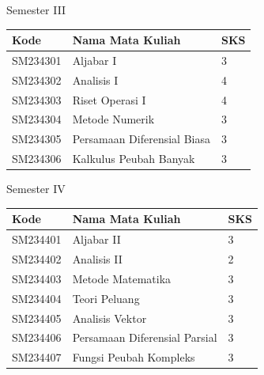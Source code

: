 \documentclass[aspectratio=169]{beamer} %
\begin{document}

\begin{frame}{Semester III}

\begin{table}
	\renewcommand{\arraystretch}{1.3}
	\setlength{\tabcolsep}{10pt}
	\begin{tabular}{l l l}
		\toprule
		\textbf{Kode} & \textbf{Nama Mata Kuliah} & \textbf{SKS} \\
		\midrule
		SM234301 & Aljabar I & 3 \\
		SM234302 & Analisis I & 4 \\
		SM234303 & Riset Operasi I & 4 \\
		SM234304 & Metode Numerik & 3 \\
		SM234305 & Persamaan Diferensial Biasa & 3 \\
		SM234306 & Kalkulus Peubah Banyak & 3 \\
		\bottomrule
	\end{tabular}
\end{table}

\end{frame}


\begin{frame}{Semester IV}

\begin{table}
	\renewcommand{\arraystretch}{1.3}
	\setlength{\tabcolsep}{10pt}
	\begin{tabular}{l l l}
		\toprule
		\textbf{Kode} & \textbf{Nama Mata Kuliah} & \textbf{SKS} \\
		\midrule
		SM234401 & Aljabar II & 3 \\	
		SM234402 & Analisis II & 2 \\	
		SM234403 & Metode Matematika & 3 \\
		SM234404 & Teori Peluang & 3 \\
		SM234405 & Analisis Vektor & 3 \\
		SM234406 & Persamaan Diferensial Parsial & 3 \\
		SM234407 & Fungsi Peubah Kompleks & 3 \\
		\bottomrule
	\end{tabular}
\end{table}

\end{frame}
\end{document}
